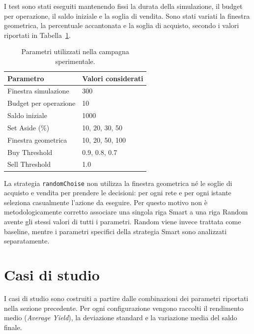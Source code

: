 \documentclass[a4paper,oneside,italian]{sapthesis}
\begin{document}
I test sono stati eseguiti mantenendo fissi la durata della simulazione, il
budget per operazione, il saldo iniziale e la soglia di vendita. Sono stati
variati la finestra geometrica, la percentuale accantonata e la soglia di
acquisto, secondo i valori riportati in Tabella~\ref{tab:experimental-parameters}.



\begin{table}[H]
    \centering
    \caption{Parametri utilizzati nella campagna sperimentale.}
    \label{tab:experimental-parameters}
    \begin{tabular}{ll}
        \toprule
        Parametro & Valori considerati \\
        \midrule
        Finestra simulazione & 300 \\
        Budget per operazione & 10 \\
        Saldo iniziale & 1000 \\
        Set Aside (\%) & 10, 20, 30, 50 \\
        Finestra geometrica & 10, 20, 50, 100 \\
        Buy Threshold & 0.9, 0.8, 0.7 \\
        Sell Threshold & 1.0 \\
        \bottomrule
    \end{tabular}
\end{table}

La strategia \texttt{randomChoise} non utilizza la finestra geometrica né le
soglie di acquisto e vendita per prendere le decisioni: per ogni rete e per
ogni istante seleziona casualmente l'azione da eseguire. Per questo motivo non
è metodologicamente corretto associare una singola riga Smart a una riga
Random avente gli stessi valori di tutti i parametri. Random viene invece
trattata come baseline, mentre i parametri specifici della strategia Smart
sono analizzati separatamente.



\section{Casi di studio}

I casi di studio sono costruiti a partire dalle combinazioni dei parametri
riportati nella sezione precedente. Per ogni configurazione vengono raccolti
il rendimento medio (\textit{Average Yield}), la deviazione standard e la
variazione media del saldo finale.
\end{document}
